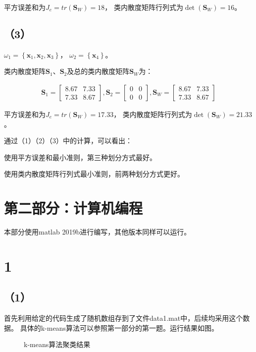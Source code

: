 \documentclass{article}
\begin{document}
平方误差和为${J_e} = tr\left( {{\pmb{S}_W}} \right) = 18$，
类内散度矩阵行列式为$\det \left( {{\pmb{S}_W}} \right) = 16$。

\subsection*{（3）}
${\omega _1} = \left\{ {{\pmb{x}_1},{\pmb{x}_2},{\pmb{x}_3}} \right\}$，
${\omega _2} = \left\{ {\pmb{x}_4} \right\}$。

类内散度矩阵${\pmb{S}_1}$、${\pmb{S}_2}$及总的类内散度矩阵${\pmb{S}_W}$为：

\begin{align*}
	{\pmb{S}_1} = \left[ {\begin{array}{*{20}{c}}
		{8.67}&{7.33}\\
		{7.33}&{8.67}
		\end{array}} \right],{\pmb{S}_2} = \left[ {\begin{array}{*{20}{c}}
		{0}&{0}\\
		{0}&{0}
		\end{array}} \right],{\pmb{S}_W} = \left[ {\begin{array}{*{20}{c}}
		{8.67}&{7.33}\\
		{7.33}&{8.67}
		\end{array}} \right]
\end{align*}

平方误差和为${J_e} = tr\left( {{\pmb{S}_W}} \right) = 17.33$，
类内散度矩阵行列式为$\det \left( {{\pmb{S}_W}} \right) = 21.33$。

通过（1）（2）（3）中的计算，可以看出：

使用平方误差和最小准则，第三种划分方式最好。

使用类内散度矩阵行列式最小准则，前两种划分方式更好。

\section*{第二部分：计算机编程}
本部分使用matlab 2019b进行编写，其他版本同样可以运行。
\section*{1}
\subsection*{（1）}
首先利用给定的代码生成了随机数组存到了文件data1.mat中，后续均采用这个数据。
具体的k-means算法可以参照第一部分的第一题。运行结果如图。
\begin{figure}[ht]
	\centering
	\centering
	\caption{k-means算法聚类结果}
	\label{figl}
\end{figure}
\end{document}

